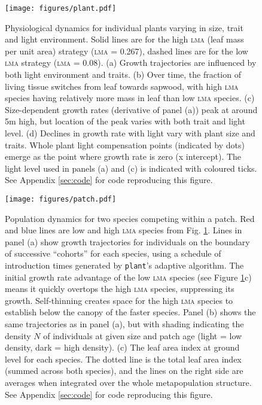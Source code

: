 \documentclass[a4paper,11pt]{article}
\newcommand{\plant}{\texttt{plant}}
\begin{document}
\newpage

\begin{figure}[h!]
\centering
\texttt{[image: figures/plant.pdf]}
\caption{Physiological dynamics for individual plants varying in size,
  trait and light environment. Solid lines are for the high
  \textsc{lma} (leaf mass per unit area) strategy (\textsc{lma} =
  0.267), dashed lines are for the low \textsc{lma} strategy
  (\textsc{lma} = 0.08).  (a) Growth trajectories are influenced by
  both light environment and traits.  (b) Over time, the fraction of
  living tissue switches from leaf towards sapwood, with high
  \textsc{lma} species having relatively more mass in leaf than low
  \textsc{lma} species. (c)
  Size-dependent growth rates (derivative of panel (a)) peak at around
  5m high, but location of the peak varies with both trait and light
  level.  (d) Declines in growth rate with light vary with plant size
  and traits.  Whole plant light compensation points (indicated by
  dots) emerge as the point where growth rate is zero (x intercept).
  The light level used in panels (a) and (c) is indicated with
  coloured ticks.  See Appendix \ref{sec:code} for code
  reproducing this figure.}
\label{fig:plant}
\end{figure}

\newpage

\begin{figure}[h!]
\centering
\texttt{[image: figures/patch.pdf]}
\caption{Population dynamics for two species competing within a patch.
  Red and blue lines are low and high \textsc{lma} species from
  Fig. \ref{fig:plant}.  Lines in panel (a) show growth trajectories
  for individuals on the boundary of successive ``cohorts'' for each
  species, using a schedule of introduction times generated by
  {\plant}'s adaptive algorithm.  The initial growth rate advantage of
  the low \textsc{lma} species (see Figure \ref{fig:plant}c) means it
  quickly overtops the high \textsc{lma} species, suppressing its
  growth.  Self-thinning creates space for the high \textsc{lma}
  species to establish below the canopy of the faster species. Panel
  (b) shows the same trajectories as in panel (a), but with shading
  indicating the density $N$ of individuals at given size and patch
  age (light = low density, dark = high density).  (c) The leaf area
  index at ground level for each species.  The dotted line is the
  total leaf area index (summed across both species), and the lines on
  the right side are averages when integrated over the whole
  metapopulation structure.  See Appendix \ref{sec:code} for code
  reproducing this figure.}
\label{fig:patch}
\end{figure}
\end{document}
